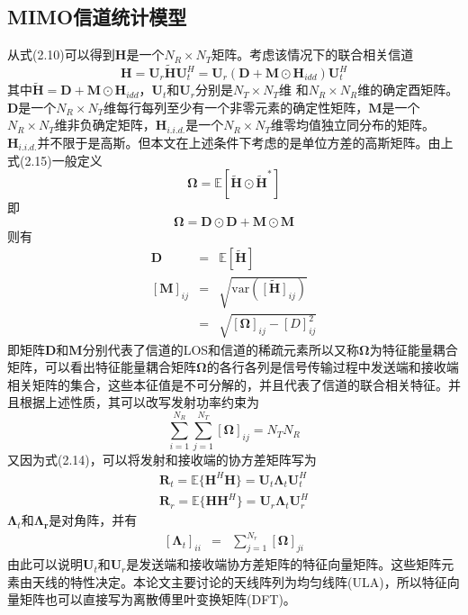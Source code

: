 \documentclass[bachelor,nocolorlinks, printoneside]{seuthesis} %
\begin{document}
\begin{Main}
\section{MIMO信道统计模型}
从式(2.10)可以得到$\mathbf{H}$是一个$N_{R} \times N_{T}$矩阵。考虑该情况下的联合相关信道
\begin{equation}\label{key}
\mathbf{H} = \mathbf{U}_{r}\tilde{\mathbf{H}}\mathbf{U}_{t}^{H} = \mathbf{U}_{r}(\mathbf{D}+\mathbf{M}\odot \mathbf{H}_{idd})\mathbf{U}_{t}^{H}
\end{equation}
其中$\tilde{\mathbf{H}} = \mathbf{D}+\mathbf{M}\odot \mathbf{H}_{idd}$，$\mathbf{U}_{t}$和$\mathbf{U}_{r}$分别是$N_{T} \times N_{T}$维 和$N_{R} \times N_{R}$维的确定酉矩阵。$\mathbf{D}$是一个$N_{R} \times N_{T}$维每行每列至少有一个非零元素的确定性矩阵，$\mathbf{M}$是一个$N_{R} \times N_{T}$维非负确定矩阵，$\mathbf{H}_{i.i.d.}$是一个$N_{R} \times N_{T}$维零均值独立同分布的矩阵。$\mathbf{H}_{i.i.d.}$并不限于是高斯。但本文在上述条件下考虑的是单位方差的高斯矩阵。由上式(2.15)一般定义
\begin{equation}\label{key}
\bm{\Omega} =\mathbb{E}[\tilde{\mathbf{H}} \odot \tilde{\mathbf{H}}^{*}]
\end{equation}
即
\begin{equation}\label{key}
\bm{\Omega} = \mathbf{D} \odot \mathbf{D} + \mathbf{M} \odot \mathbf{M}
\end{equation}
则有
\begin{eqnarray}\label{key}
\mathbf{D} & = & \mathbb{E}[\tilde{\mathbf{H}}] \\
\left[  \mathbf{M} \right]_{ij} & = & \sqrt{\mathrm{var}(\tilde{[\mathbf{H}]}_{ij})} \nonumber \\
& = & \sqrt{[\bm{\Omega}]_{ij}-[D]_{ij}^{2}}
\end{eqnarray}
即矩阵$\mathbf{D}$和$\mathbf{M}$分别代表了信道的LOS和信道的稀疏元素所以又称$\bm{\Omega} $为特征能量耦合矩阵，可以看出特征能量耦合矩阵$\bm{\Omega}$的各行各列是信号传输过程中发送端和接收端相关矩阵的集合，这些本征值是不可分解的，并且代表了信道的联合相关特征。并且根据上述性质，其可以改写发射功率约束为
\begin{equation}\label{key}
\sum_{i=1}^{N_{R}}\sum_{j=1}^{N_{T}}[\bm{\Omega}]_{ij} = N_{T}N_{R}
\end{equation}
又因为式(2.14)，可以将发射和接收端的协方差矩阵写为
\begin{eqnarray}\label{key}
\mathbf{R}_{t}=\mathbb{E}\lbrace \mathbf{H}^{H}\mathbf{H} \rbrace = \mathbf{U}_{t}\bm{\Lambda}_{t}\mathbf{U}_{t}^{H} \\
\mathbf{R}_{r}=\mathbb{E}\lbrace \mathbf{H}\mathbf{H}^{H} \rbrace = \mathbf{U}_{r}\bm{\Lambda}_{t}\mathbf{U}_{r}^{H}
\end{eqnarray}
$\bm{\Lambda}_{t}$和$\bm{\Lambda_{r}}$是对角阵，并有
\begin{eqnarray}\label{key}
[\bm{\Lambda}_{t}]_{ii} & = & \sum_{j=1}^{N_{r}} [\bm{\Omega}]_{ji} 
\end{eqnarray}
由此可以说明$\mathbf{U}_{t}$和$\mathbf{U}_{r}$是发送端和接收端协方差矩阵的特征向量矩阵。这些矩阵元素由天线的特性决定。本论文主要讨论的天线阵列为均匀线阵(ULA)，所以特征向量矩阵也可以直接写为离散傅里叶变换矩阵(DFT)。


\end{Main}
\end{document}
